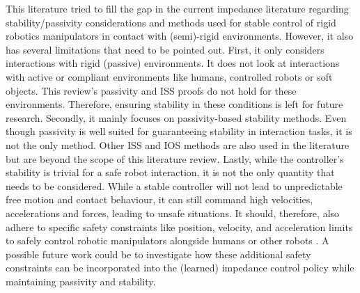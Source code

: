 This literature tried to fill the gap in the current impedance literature regarding stability/passivity considerations and methods used for stable control of rigid robotics manipulators in contact with (semi)-rigid environments. However, it also has several limitations that need to be pointed out. First, it only considers interactions with rigid (passive) environments. It does not look at interactions with active or compliant environments like humans, controlled robots or soft objects. This review's passivity and ISS proofs do not hold for these environments. Therefore, ensuring stability in these conditions is left for future research. Secondly, it mainly focuses on passivity-based stability methods. Even though passivity is well suited for guaranteeing stability in interaction tasks, it is not the only method. Other ISS and IOS methods are also used in the literature but are beyond the scope of this literature review. Lastly, while the controller's stability is trivial for a safe robot interaction, it is not the only quantity that needs to be considered. While a stable controller will not lead to unpredictable free motion and contact behaviour, it can still command high velocities, accelerations and forces, leading to unsafe situations. It should, therefore, also adhere to specific safety constraints like position, velocity, and acceleration limits to safely control robotic manipulators alongside humans or other robots \cite{lasotaSurveyMethodsSafe2017,chowLyapunovbasedApproachSafe2018,sadanandananandSafeLearningControl2021,sharkawyHumanRobotInteraction2022}. A possible future work could be to investigate how these additional safety constraints can be incorporated into the (learned) impedance control policy while maintaining passivity and stability.
